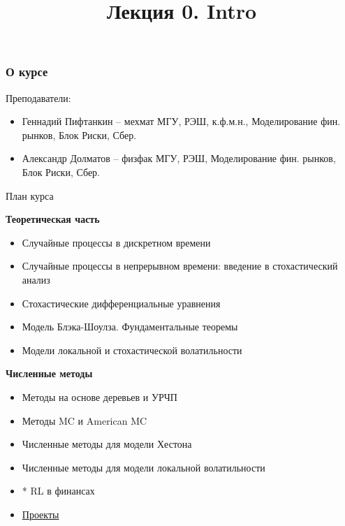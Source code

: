 \documentclass{beamer}
\title[Введение]{Лекция 0. Intro} %
\begin{document}
\begin{frame}
\titlepage 
\end{frame}
\begin{frame}
\frametitle{О курсе} 
Преподаватели:
\begin{itemize} 
    \item Геннадий Пифтанкин -- мехмат МГУ, РЭШ, к.ф.м.н., Моделирование фин. рынков, Блок Риски, Сбер. 
    \item Александр Долматов -- физфак МГУ, РЭШ, Моделирование фин. рынков, Блок Риски, Сбер. 
\end{itemize}
\end{frame}

\begin{frame}{План курса}

\textbf{Теоретическая часть}
\begin{itemize}
    \item Случайные процессы в дискретном времени
    \item Случайные процессы в непрерывном времени: введение в стохастический анализ
    \item Стохастические дифференциальные уравнения
    \item Модель Блэка-Шоулза. Фундаментальные теоремы     
    \item Модели локальной и стохастической волатильности
\end{itemize}

\textbf{Численные методы}
\begin{itemize}
    \item Методы на основе деревьев и УРЧП
    \item Методы MC и American MC
    \item Численные методы для модели Хестона
    \item Численные методы для модели локальной волатильности
    \item* RL в финансах
    \item \href{https://github.com/dolmatovas/quant_finance_hse/tree/main/projects}{Проекты} 
\end{itemize}
\end{frame}
\end{document}
